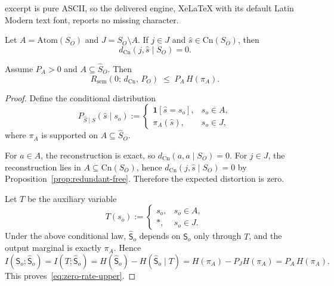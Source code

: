 \documentclass[10pt,a4paper]{amsart}
\newcommand{\Atom}{\text{Atom}}
\newcommand{\Cn}{\text{Cn}}
\begin{document}
excerpt is pure ASCII, so the delivered engine, XeLaTeX with its default Latin Modern text font, reports no missing character.
\begin{proposition}
\label{prop:redundant-free}
Let \(A=\Atom(S_O)\) and \(J=S_O\setminus A\).
If \(j\in J\) and \(\hat s\in\Cn(S_O)\), then
\[
  d_{\Cn}(j,\hat s\mid S_O)=0.
\]
\end{proposition}

\begin{proposition}
\label{prop:zero-rate-ach}
Assume \(P_A>0\) and \(A\subseteq \hat S_O\). Then
\begin{equation}\label{eq:zero-rate-upper}
  R_{\mathrm{sem}}(0;\,d_{\Cn},\,P_O)
  \;\le\;
  P_A\,H(\pi_A).
\end{equation}
\end{proposition}

\begin{proof}
Define the conditional distribution
\[
  P_{\hat S\mid S}(\hat s\mid s_o)
  :=
  \begin{cases}
    \mathbf{1}[\hat s=s_o], & s_o\in A,\\[3pt]
    \pi_A(\hat s), & s_o\in J,
  \end{cases}
\]
where \(\pi_A\) is supported on \(A\subseteq\hat S_O\).

For \(a\in A\), the reconstruction is exact, so
\(d_{\Cn}(a,a\mid S_O)=0\).
For \(j\in J\), the reconstruction lies in
\(A\subseteq\Cn(S_O)\), hence
\(d_{\Cn}(j,\hat s\mid S_O)=0\) by
Proposition~\ref{prop:redundant-free}.
Therefore the expected distortion is zero.

Let \(T\) be the auxiliary variable
\[
  T(s_o)
  :=
  \begin{cases}
    s_o, & s_o\in A,\\
    *,   & s_o\in J.
  \end{cases}
\]
Under the above conditional law, \(\hat {\mathsf{S}}_o\) depends on \({\mathsf{S}}_o\)
only through \(T\), and the output marginal is exactly \(\pi_A\).
Hence
\[
  I({\mathsf{S}}_o;\hat {\mathsf{S}}_o)
  =I(T;\hat {\mathsf{S}}_o)
  =H(\hat {\mathsf{S}}_o)-H(\hat {\mathsf{S}}_o\mid T)
  =H(\pi_A)-P_J H(\pi_A)
  =P_A\,H(\pi_A).
\]
This proves~\eqref{eq:zero-rate-upper}.
\end{proof}
\end{document}
